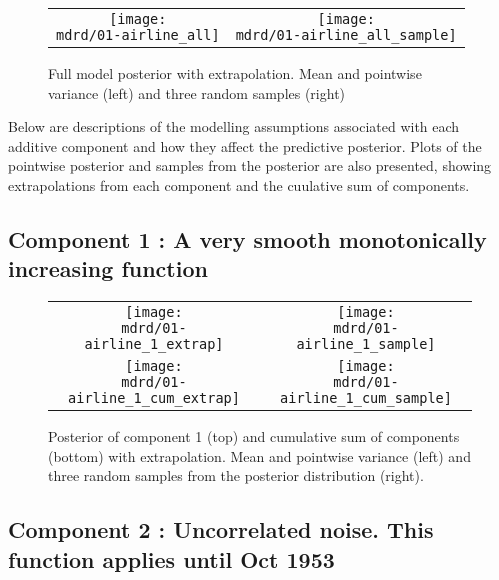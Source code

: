 \documentclass{article} %
\begin{document}
\begin{figure}[H]
\newcommand{\wmgd}{0.5\columnwidth}
\newcommand{\hmgd}{3.0cm}
\newcommand{\mdrd}{01-airline}
\newcommand{\mbm}{\hspace{-0.3cm}}
\begin{tabular}{cc}
\mbm \texttt{[image: \\mdrd/01-airline\_all]} & \texttt{[image: \\mdrd/01-airline\_all\_sample]}
\end{tabular}
\caption{Full model posterior with extrapolation. Mean and pointwise variance (left) and three random samples (right)}
\label{fig:extrap}
\end{figure}

Below are descriptions of the modelling assumptions associated with each additive component and how they affect the predictive posterior.
Plots of the pointwise posterior and samples from the posterior are also presented, showing extrapolations from each component and the cuulative sum of components.

\subsection{Component 1 : A very smooth monotonically increasing function}



\begin{figure}[H]
\newcommand{\wmgd}{0.5\columnwidth}
\newcommand{\hmgd}{3.0cm}
\newcommand{\mdrd}{01-airline}
\newcommand{\mbm}{\hspace{-0.3cm}}
\begin{tabular}{cc}
\mbm \texttt{[image: \\mdrd/01-airline\_1\_extrap]} & \texttt{[image: \\mdrd/01-airline\_1\_sample]} \\
\mbm \texttt{[image: \\mdrd/01-airline\_1\_cum\_extrap]} & \texttt{[image: \\mdrd/01-airline\_1\_cum\_sample]}
\end{tabular}
\caption{Posterior of component 1 (top) and cumulative sum of components (bottom) with extrapolation. Mean and pointwise variance (left) and three random samples from the posterior distribution (right).}
\label{fig:extrap1}
\end{figure}

\subsection{Component 2 : Uncorrelated noise. This function applies until Oct 1953}
\end{document}
